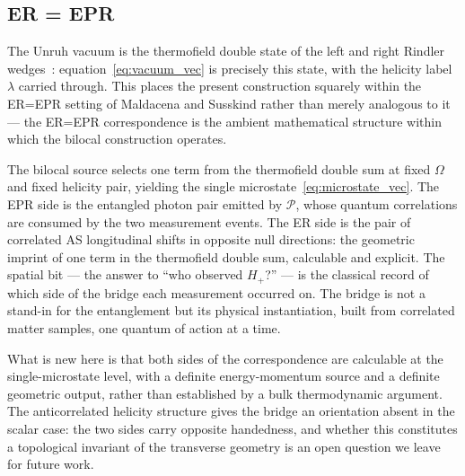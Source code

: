 \documentclass[12pt,a4paper]{article}
\begin{document}
\subsection{ER = EPR}

The Unruh vacuum is the thermofield double state of the left 
and right Rindler wedges~\cite{maldacena2013cool}: 
equation~\eqref{eq:vacuum_vec} is precisely this state, with 
the helicity label $\lambda$ carried through. This places the 
present construction squarely within the ER=EPR setting of 
Maldacena and Susskind rather than merely analogous to it --- 
the ER=EPR correspondence is the ambient mathematical structure 
within which the bilocal construction operates.

The bilocal source selects one term from the thermofield double 
sum at fixed $\Omega$ and fixed helicity pair, yielding the 
single microstate~\eqref{eq:microstate_vec}. The EPR side is 
the entangled photon pair emitted by $\mathcal{P}$, whose 
quantum correlations are consumed by the two measurement events. 
The ER side is the pair of correlated AS longitudinal shifts in 
opposite null directions: the geometric imprint of one term in 
the thermofield double sum, calculable and explicit. The spatial 
bit --- the answer to ``who observed $H_+$?'' --- is the classical 
record of which side of the bridge each measurement occurred on. 
The bridge is not a stand-in for the entanglement but its 
physical instantiation, built from correlated matter samples, 
one quantum of action at a time.

What is new here is that both sides of the correspondence are 
calculable at the single-microstate level, with a definite 
energy-momentum source and a definite geometric output, rather 
than established by a bulk thermodynamic argument. The 
anticorrelated helicity structure gives the bridge an orientation 
absent in the scalar case: the two sides carry opposite 
handedness, and whether this constitutes a topological invariant 
of the transverse geometry is an open question we leave for 
future work.


\end{document}
